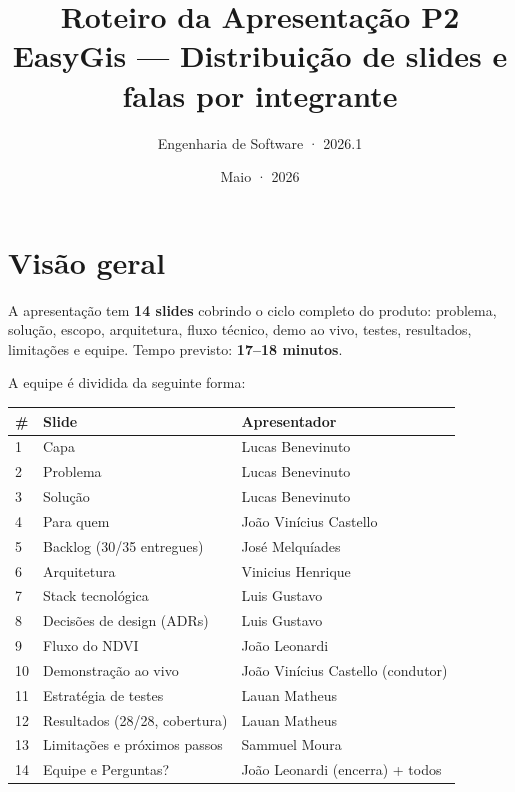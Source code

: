 \documentclass[12pt,a4paper]{article}
\title{\textbf{Roteiro da Apresentação P2}\\[6pt]
       \large EasyGis — Distribuição de slides e falas por integrante}
\author{Engenharia de Software · 2026.1}
\date{Maio · 2026}
\begin{document}
\maketitle

\section*{Visão geral}

A apresentação tem \textbf{14 slides} cobrindo o ciclo completo do produto:
problema, solução, escopo, arquitetura, fluxo técnico, demo ao vivo, testes,
resultados, limitações e equipe. Tempo previsto: \textbf{17--18 minutos}.

\vspace{4pt}
A equipe é dividida da seguinte forma:

\begin{center}
\renewcommand{\arraystretch}{1.35}
\begin{tabularx}{\textwidth}{@{}l l X@{}}
\toprule
\textbf{\#} & \textbf{Slide} & \textbf{Apresentador} \\
\midrule
1  & Capa                              & Lucas Benevinuto \\
2  & Problema                          & Lucas Benevinuto \\
3  & Solução                           & Lucas Benevinuto \\
4  & Para quem                         & João Vinícius Castello \\
5  & Backlog (30/35 entregues)         & José Melquíades \\
6  & Arquitetura                       & Vinicius Henrique \\
7  & Stack tecnológica                 & Luis Gustavo \\
8  & Decisões de design (ADRs)         & Luis Gustavo \\
9  & Fluxo do NDVI                     & João Leonardi \\
10 & Demonstração ao vivo              & João Vinícius Castello (condutor) \\
11 & Estratégia de testes              & Lauan Matheus \\
12 & Resultados (28/28, cobertura)     & Lauan Matheus \\
13 & Limitações e próximos passos      & Sammuel Moura \\
14 & Equipe e Perguntas?               & João Leonardi (encerra) + todos \\
\bottomrule
\end{tabularx}
\end{center}
\end{document}
